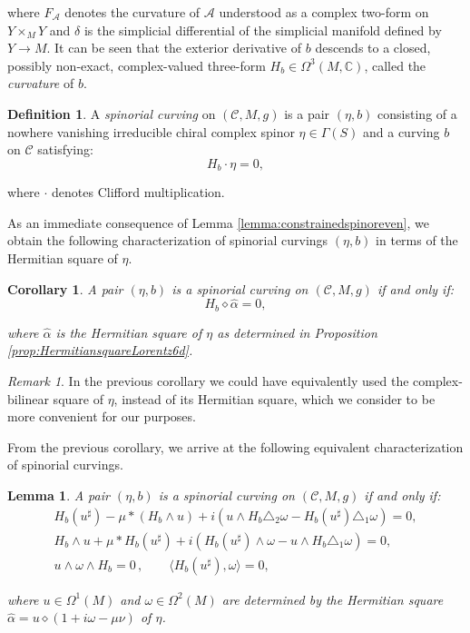 \documentclass[10pt,a4paper,twoside,reqno]{amsart}
\theoremstyle{plain}
\newtheorem{lemma}[thm]{Lemma}
\newtheorem{cor}[thm]{Corollary}
\theoremstyle{definition}
\newtheorem{definition}[thm]{Definition}
\theoremstyle{remark}
\newtheorem{remark}[thm]{Remark}
\def\C{\mathbb{C}}
\def\cC{{\mathcal C}}
\def\cA{\mathcal{A}}
\def\cC{\mathcal{C}}
\newcommand{\escal}[1]{\langle#1\rangle}
\begin{document}
\noindent
where $F_{\cA}$ denotes the curvature of $\cA$ understood as a complex two-form on $Y\times_M Y$ and $\delta$ is the simplicial differential of the simplicial manifold defined by $Y\to M$. It can be seen that the exterior derivative of $b$ descends to a closed, possibly non-exact, complex-valued three-form $H_b \in \Omega^3(M ,\C)$, called the \emph{curvature} of $b$.
 
\begin{definition}
A \emph{spinorial curving} on $(\cC,M,g)$ is a pair $(\eta,b)$ consisting of a nowhere vanishing irreducible chiral complex spinor $\eta \in \Gamma(S)$ and a curving $b$ on $\cC$ satisfying:
\begin{equation*}
H_b\cdot \eta = 0,
\end{equation*}

\noindent
where $\cdot$ denotes Clifford multiplication. 
\end{definition}

\noindent
As an immediate consequence of Lemma \ref{lemma:constrainedspinoreven}, we obtain the following characterization of spinorial curvings $(\eta,b)$ in terms of the Hermitian square of $\eta$.

\begin{cor}
A pair $(\eta,b)$ is a spinorial curving on $(\cC,M,g)$ if and only if:
\begin{equation}
\label{eq:Hbspinorial}
H_b \diamond \widehat{\alpha} = 0,
\end{equation}

\noindent
where $\widehat{\alpha}$ is the Hermitian square of $\eta$ as determined in Proposition \ref{prop:HermitiansquareLorentz6d}.
\end{cor}

\begin{remark}
In the previous corollary we could have equivalently used the complex-bilinear square of $\eta$, instead of its Hermitian square, which we consider to be more convenient for our purposes.
\end{remark}

\noindent
From the previous corollary, we arrive at the following equivalent characterization of spinorial curvings.

\begin{lemma}
\label{lemma:spinorialcurving}
A pair $(\eta,b)$ is a spinorial curving on $(\cC,M,g)$ if and only if:
\begin{gather*}
H_b(u^\sharp) - \mu \ast (H_b \wedge u) + i( u\wedge H_b\triangle_2 \omega - H_b(u^\sharp) \triangle_1 \omega ) = 0,\\
H_b\wedge u + \mu \ast H_b(u^\sharp) + i (H_b (u^\sharp)\wedge \omega - u \wedge H_b\triangle_1\omega) = 0,\\
u\wedge \omega \wedge H_b = 0 \, , \qquad \escal{H_b(u^\sharp),\omega} = 0,
\end{gather*}

\noindent
where $u\in \Omega^1(M)$ and $\omega \in \Omega^2(M)$ are determined by the Hermitian square $\widehat{\alpha} = u \diamond (1 + i \omega - \mu \nu)$ of $\eta$.
\end{lemma}
\end{document}
